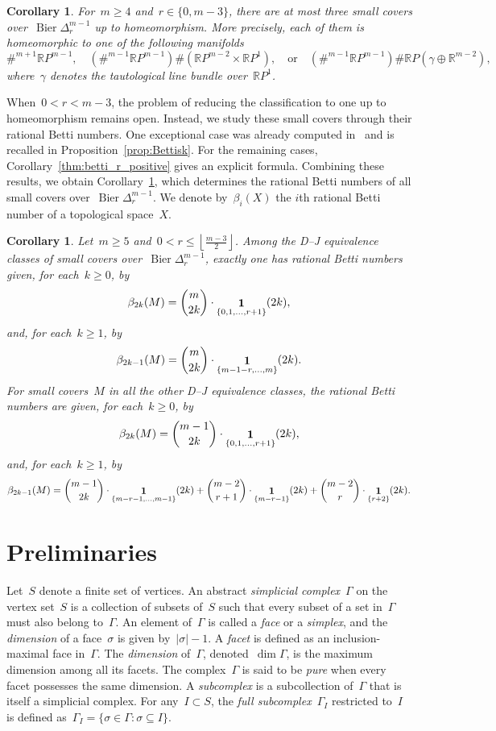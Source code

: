 \documentclass[11pt]{amsart}
\theoremstyle{plain}
\newtheorem{corollary}[theorem]{Corollary}
\numberwithin{equation}{section}
\theoremstyle{definition}
\newcommand{\R}{\mathbb{R}}
\newcommand{\RP}{\mathbb{R}P}
\DeclareMathOperator{\Bier}{Bier}
\DeclareMathOperator{\ind}{\mathbf{1}}
\begin{document}
\begin{corollary}\label{thm:main2}
    For~$m\geq 4$ and~$r\in\{0,m-3\}$, there are at most three small covers over~$\Bier\Delta_{r}^{m-1}$ up to homeomorphism.
    More precisely, each of them is homeomorphic to one of the following manifolds
    $$
        \#^{m+1}\RP^{m-1}, \quad (\#^{m-1}\RP^{m-1})\#(\RP^{m-2}\times \RP^1), \quad \text{or} \quad (\#^{m-1}\RP^{m-1})\#\RP(\gamma\oplus \R^{m-2}),
    $$
    where~$\gamma$ denotes the tautological line bundle over~$\RP^1$.
\end{corollary}
When~$0<r<m-3$, the problem of reducing the classification to one up to homeomorphism remains open.
Instead, we study these small covers through their rational Betti numbers. One exceptional case was already computed in~\cite{Choi-Yoon-Yu2026} and is recalled in Proposition~\ref{prop:Bettisk}.
For the remaining cases, Corollary~\ref{thm:betti_r_positive} gives an explicit formula.
Combining these results, we obtain Corollary~\ref{cor:main}, which determines the rational Betti numbers of all small covers over~$\Bier\Delta_r^{m-1}$.
We denote by~$\beta_{i}(X)$ the $i$th rational Betti number of a topological space~$X$.
\begin{corollary}\label{cor:main}
    Let~$m\geq 5$ and~$0<r\leq \left\lfloor \frac{m-3}{2}\right\rfloor$. 
    Among the D--J equivalence classes of small covers over~$\Bier\Delta_r^{m-1}$, exactly one has rational Betti numbers given, for each~$k\geq0$, by
$$
\beta_{2k}(M) = \dbinom{m}{2k} \cdot \ind_{\{0,1,\ldots,r+1\}}(2k),
$$
and, for each~$k \geq 1$, by
$$
\beta_{2k-1}(M) = \dbinom{m}{2k} \cdot \ind_{\{m-1-r,\ldots,m\}}(2k).
$$
For small covers~$M$ in all the other D--J equivalence classes, the rational Betti numbers are given, for each~$k\geq 0$, by
$$
\beta_{2k}(M) = \dbinom{m-1}{2k} \cdot \ind_{\{0,1,\ldots,r+1\}}(2k),
$$
and, for each~$k\geq 1$, by
$$
\beta_{2k-1}(M) = \dbinom{m-1}{2k} \cdot \ind_{\{m-r-1,\ldots,m-1\}}(2k) + \dbinom{m-2}{r+1} \cdot \ind_{\{m-r-1\}}(2k) + \dbinom{m-2}{r} \cdot \ind_{\{r+2\}}(2k).
$$
\end{corollary}

\section{Preliminaries}
Let~$S$ denote a finite set of vertices. 
An abstract \emph{simplicial complex}~$\Gamma$ on the vertex set~$S$ is a collection of subsets of~$S$ such that every subset of a set in~$\Gamma$ must also belong to~$\Gamma$.
An element of~$\Gamma$ is called a \emph{face} or a \emph{simplex}, and the \emph{dimension} of a face~$\sigma$ is given by~$\left\vert \sigma \right\vert - 1$. 
A \emph{facet} is defined as an inclusion-maximal face in~$\Gamma$.
The \emph{dimension} of~$\Gamma$, denoted~$\dim \Gamma$, is the maximum dimension among all its facets.
The complex~$\Gamma$ is said to be \emph{pure} when every facet possesses the same dimension.
A \emph{subcomplex} is a subcollection of~$\Gamma$ that is itself a simplicial complex.
For any~$I \subset S$, the \emph{full subcomplex}~$\Gamma_I$ restricted to~$I$ is defined as~$\Gamma_I= \{\sigma \in \Gamma \colon \sigma \subseteq I\}$.
\end{document}
